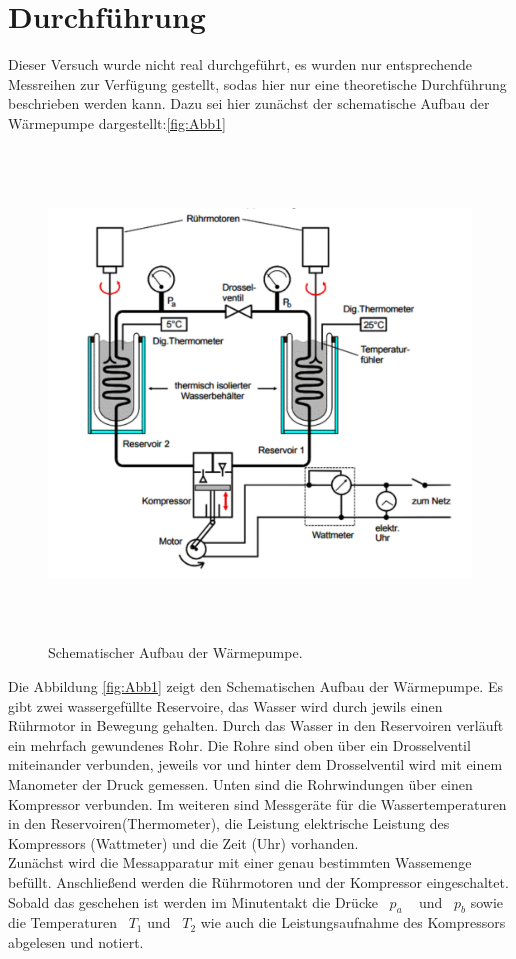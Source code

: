 \section{Durchführung}
\label{sec:Durchführung}

Dieser Versuch wurde nicht real durchgeführt, es wurden nur entsprechende Messreihen zur Verfügung gestellt,
sodas hier nur eine theoretische Durchführung beschrieben werden kann. Dazu sei hier zunächst der schematische Aufbau 
der Wärmepumpe dargestellt:\ref{fig:Abb1} 

\begin{figure}
    \centering
    \includegraphics[width=15cm,height=13cm]{SchemaWarmepumpe.pdf}
    \caption{Schematischer Aufbau der Wärmepumpe.}
    \label{fig:Abb.1}
  \end{figure}

\noindent Die Abbildung \ref{fig:Abb1} zeigt den Schematischen Aufbau der Wärmepumpe. Es gibt zwei wassergefüllte
Reservoire, das Wasser wird durch jewils einen Rührmotor in Bewegung gehalten. Durch das Wasser 
in den Reservoiren verläuft ein mehrfach gewundenes Rohr. Die Rohre sind oben über ein Drosselventil 
miteinander verbunden, jeweils vor und hinter dem Drosselventil wird mit einem Manometer der Druck gemessen.
Unten sind die Rohrwindungen über einen Kompressor verbunden. Im weiteren sind Messgeräte für die 
Wassertemperaturen in den Reservoiren(Thermometer), die Leistung elektrische Leistung des 
Kompressors (Wattmeter) und die Zeit (Uhr) vorhanden. \\


\noindent Zunächst wird die Messapparatur mit einer genau bestimmten Wassemenge befüllt. Anschließend werden die Rührmotoren
und der Kompressor eingeschaltet. Sobald das geschehen ist werden im Minutentakt
die Drücke ~$p_a$ ~ und ~$p_b$ 
sowie die Temperaturen ~$T_1 $
und ~$T_2$ wie auch die Leistungsaufnahme des Kompressors abgelesen und notiert. 

